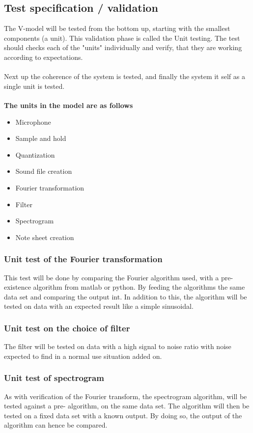 \subsection{Test specification / validation}
The V-model will be tested from the bottom up, starting with the smallest components (a unit). This validation phase is called the Unit testing. The test should checks each of the "units" individually and verify, that they are working according to expectations. \\\\
Next up the coherence of the system is tested, and finally the system it self as a single unit is tested. 
\\\\

\textbf{The  units in the model are as follows }
\begin{itemize}
	\item Microphone
	\item Sample and hold
	\item Quantization
	\item Sound file creation
	\item Fourier transformation
	\item Filter
	\item Spectrogram
	\item Note sheet creation
\end{itemize}


\subsubsection{Unit test of the Fourier transformation}
This test will be done by comparing the Fourier algorithm used, with a pre-existence algorithm from matlab or python.
By feeding the algorithms the same data set and comparing the output int. 
In addition to this, the algorithm will be tested on data with an expected result like a simple sinusoidal.
\subsubsection{Unit test on the choice of filter}
The filter will be tested on data with a high signal to noise ratio with noise expected to find in a normal use situation added on.
\subsubsection{Unit test of spectrogram}
As with verification of the Fourier transform, the spectrogram algorithm, will be tested against a pre- algorithm, on the same data set.
The algorithm will then be tested on a fixed data set with a known output.
By doing so, the output of the algorithm can hence be compared.

